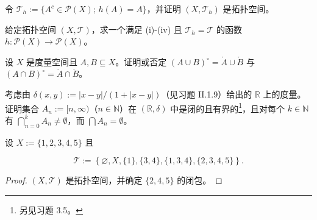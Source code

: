 \begin{exercises}
\begin{items}
令 $ \mathcal{T}_h := \{ A^c \in \mathcal{P}(X) ; \, h(A) = A \} $，并证明 $ (X, \mathcal{T}_h) $ 是拓扑空间。

\item

给定拓扑空间 $ (X, \mathcal{T}) $，求一个满足 (i)-(iv) 且 $ \mathcal{T}_h = \mathcal{T} $ 的函数 $ h: \mathcal{P}(X) \to \mathcal{P}(X) $。

\end{items}

\item

设 $X$ 是度量空间且 $A, B \subseteq X$。证明或否定 $(A \cup B)^\circ = \mathring{A} \cup \mathring{B}$ 与 $(A \cap B)^\circ = \mathring{A} \cap \mathring{B}$。

\item

考虑由 $ \delta(x, y) := |x - y|/(1 + |x - y|) $（见习题 II.1.9）给出的 $ \mathbb{R} $ 上的度量。证明集合 $ A_n := [n, \infty) $（$ n \in \mathbb{N} $）在 $ (\mathbb{R}, \delta) $ 中是闭的且有界的\footnote{另见习题 3.5。}，且对每个 $ k \in \mathbb{N} $ 有 $ \bigcap_{n=0}^{k} A_n \neq \emptyset $，而 $ \bigcap A_n = \emptyset $。

\item

设 $X := \{1, 2, 3, 4, 5\}$ 且

\[
\mathcal{T}:=\left\{\varnothing,X,\{1\},\{3,4\},\{1,3,4\},\{2,3,4,5\}\right\}.
\]
\end{exercises}

\begin{proof}

$ (X, \mathcal{T}) $ 是拓扑空间，并确定 $ \{2, 4, 5\} $ 的闭包。

\end{proof}

